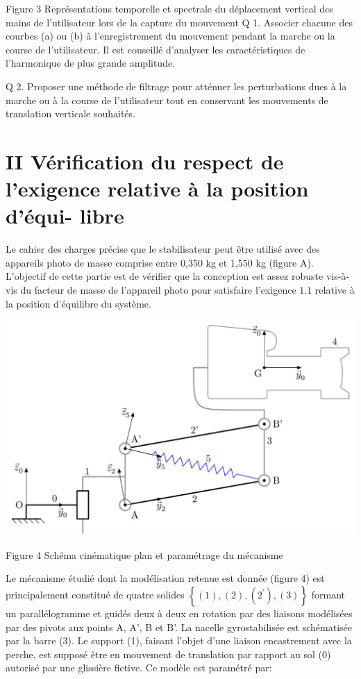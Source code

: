 \documentclass[10pt]{article}
\begin{document}
Figure 3 Représentations temporelle et spectrale du déplacement vertical des mains de l'utilisateur lors de la capture du mouvement Q 1. Associer chacune des courbes (a) ou (b) à l'enregistrement du mouvement pendant la marche ou la course de l'utilisateur. Il est conseillé d'analyser les caractéristiques de l'harmonique de plus grande amplitude.

Q 2. Proposer une méthode de filtrage pour atténuer les perturbations dues à la marche ou à la course de l'utilisateur tout en conservant les mouvements de translation verticale souhaités.

\section*{II Vérification du respect de l'exigence relative à la position d'équi- libre }
Le cahier des charges précise que le stabilisateur peut être utilisé avec des appareils photo de masse comprise entre 0,350 kg et 1,550 kg (figure A). L'objectif de cette partie est de vérifier que la conception est assez robuste vis-à-vis du facteur de masse de l'appareil photo pour satisfaire l'exigence $1.1$ relative à la position d'équilibre du système.

\begin{center}
\includegraphics[max width=\textwidth]{2022_12_31_ed674c1a831ea1bff3a0g-03}
\end{center}

Figure 4 Schéma cinématique plan et paramétrage du mécanisme

Le mécanisme étudié dont la modélisation retenue est donnée (figure 4) est principalement constitué de quatre solides $\left\{(1),(2),\left(2^{\prime}\right),(3)\right\}$ formant un parallélogramme et guidés deux à deux en rotation par des liaisons modélisées par des pivots aux points A, A', B et B'. La nacelle gyrostabilisée est schématisée par la barre (3). Le support (1), faisant l'objet d'une liaison encastrement avec la perche, est supposé être en mouvement de translation par rapport au sol (0) autorisé par une glissière fictive. Ce modèle est paramétré par:
\end{document}
